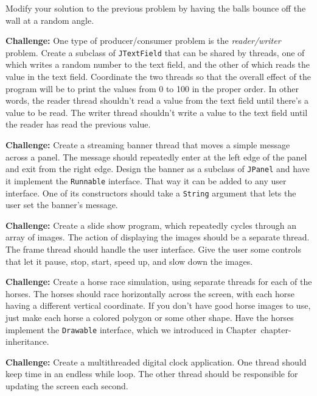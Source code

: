 \begin{EXRtwo}
\item  Modify your solution to the previous problem by having
the balls bounce off the wall at a random angle.


\item  {\bf Challenge:} One type of producer/consumer problem
is the {\it reader/writer} problem.  Create a subclass of
{\tt JTextField} that can be shared by threads, one of which writes a
random number to the text field, and the other of which reads the
value in the text field.  Coordinate the two threads so that the
overall effect of the program will be to print the values from 0
to 100 in the proper order.  In other words, the reader thread
shouldn't read a value from the text field until there's a value to
be read.   The writer thread shouldn't write a value to the text field
until the reader has read the previous value.

\item  {\bf Challenge:} Create a streaming banner thread that
moves a simple message across a panel.  The message should repeatedly
enter at the left edge of the panel and exit from the right
edge.  Design the banner as a subclass of {\tt JPanel} and have it
implement the {\tt Runnable} interface.  That way it can be added to
any user interface.  One of its constructors should take a {\tt String}
argument that lets the user set the banner's message.

\item {\bf Challenge: } Create a slide show program, which repeatedly
cycles through an array of images.  The action of displaying the
images should be a separate thread.  The frame thread should handle
the user interface.  Give the user some controls that let it pause,
stop, start, speed up, and slow down the images.

\item  {\bf Challenge:} Create a horse race simulation, using separate
threads for each of the horses.  The horses should race horizontally
across the screen, with each horse having a different vertical
coordinate.  If you don't have good horse images to use, just
make each horse a colored polygon or some other shape.  Have the
horses implement the {\tt Drawable} interface, which we introduced
in Chapter~{chapter-inheritance}.

\item  {\bf Challenge:} Create a multithreaded digital clock application.
One thread should keep time in an endless while loop. The other
thread should be responsible for updating the screen each second.

\end{EXRtwo}
